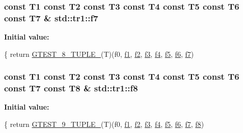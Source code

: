 \subsubsection[{f7}]{\setlength{\rightskip}{0pt plus 5cm}const T1 const T2 const T3 const T4 const T5 const T6 const T7 \& std\+::tr1\+::f7}\label{namespacestd_1_1tr1_a2185f3a1c07f2df072c39cb91ffa89a4}
{\bfseries Initial value\+:}
\begin{DoxyCode}
\{
  \textcolor{keywordflow}{return} \hyperlink{gtest-tuple_8h_a2bc36d1a71a551e6cda2ac5504fb7ce3}{GTEST\_8\_TUPLE\_}(T)(f0, \hyperlink{namespacestd_1_1tr1_a9c0fa65b105f8e2f58ba59ecf75fd000}{f1}, \hyperlink{namespacestd_1_1tr1_a87dd9e009868361317f587126dba63d4}{f2}, \hyperlink{namespacestd_1_1tr1_a0f7c3b47d27d42d82d1a333ea420ce4e}{f3}, \hyperlink{namespacestd_1_1tr1_adc796e02b7385d526aff708189564f67}{f4}, \hyperlink{namespacestd_1_1tr1_a9c1eb66b2b2fa321942af95405232a0d}{f5}, \hyperlink{namespacestd_1_1tr1_a6b62f32e1e3e21bceb94eb46c4cbfd56}{f6}, 
      \hyperlink{namespacestd_1_1tr1_a2185f3a1c07f2df072c39cb91ffa89a4}{f7})
\end{DoxyCode}
\hypertarget{namespacestd_1_1tr1_ab998afa41cea8d6d26d7e4288b0bf974}{}
\subsubsection[{f8}]{\setlength{\rightskip}{0pt plus 5cm}const T1 const T2 const T3 const T4 const T5 const T6 const T7 const T8 \& std\+::tr1\+::f8}\label{namespacestd_1_1tr1_ab998afa41cea8d6d26d7e4288b0bf974}
{\bfseries Initial value\+:}
\begin{DoxyCode}
\{
  \textcolor{keywordflow}{return} \hyperlink{gtest-tuple_8h_a1a81c17bfe3cdceb4d56b15985a44a7e}{GTEST\_9\_TUPLE\_}(T)(f0, \hyperlink{namespacestd_1_1tr1_a9c0fa65b105f8e2f58ba59ecf75fd000}{f1}, \hyperlink{namespacestd_1_1tr1_a87dd9e009868361317f587126dba63d4}{f2}, \hyperlink{namespacestd_1_1tr1_a0f7c3b47d27d42d82d1a333ea420ce4e}{f3}, \hyperlink{namespacestd_1_1tr1_adc796e02b7385d526aff708189564f67}{f4}, \hyperlink{namespacestd_1_1tr1_a9c1eb66b2b2fa321942af95405232a0d}{f5}, \hyperlink{namespacestd_1_1tr1_a6b62f32e1e3e21bceb94eb46c4cbfd56}{f6}, 
      \hyperlink{namespacestd_1_1tr1_a2185f3a1c07f2df072c39cb91ffa89a4}{f7}, \hyperlink{namespacestd_1_1tr1_ab998afa41cea8d6d26d7e4288b0bf974}{f8})
\end{DoxyCode}
\hypertarget{namespacestd_1_1tr1_a216d2c7cdfaaf415caba2f88e2c34413}{}
